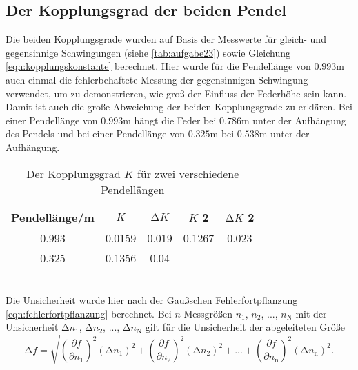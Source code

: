   \subsection{Der Kopplungsgrad der beiden Pendel}
  \label{sec:kopplungsgrad}
  Die beiden Kopplungsgrade wurden auf Basis der Messwerte für gleich- und gegensinnige Schwingungen (siehe \ref{tab:aufgabe23}) sowie Gleichung \eqref{eqn:kopplungskonstante}
  berechnet. Hier wurde für die Pendellänge von $0.993$m auch einmal die fehlerbehaftete Messung der
  gegensinnigen Schwingung verwendet, um zu demonstrieren, wie groß der Einfluss der Federhöhe sein kann. Damit ist auch die
  große Abweichung der beiden Kopplungsgrade zu erklären. Bei einer Pendellänge von $0.993$m hängt die Feder bei $0.786$m unter
  der Aufhängung des Pendels und bei einer Pendellänge von $0.325$m bei $0.538$m unter der Aufhängung.
    \begin{table}
      \centering
        \caption{Der Kopplungsgrad $K$ für zwei verschiedene Pendellängen}
          \label{tab:aufgabe5}
          \begin{tabular}{S S S S S}
            \toprule
            {Pendellänge/m} & {$K$}  & {$\increment K$} & {$K$ 2} & {$\increment K$ 2}\\
               &   0.0159 & 0.019 &  0.1267 & 0.023\\
            0.325   &   0.1356 & 0.04  &         &      \\
            \bottomrule
          \end{tabular}
        \end{table}
        \\
        Die Unsicherheit wurde hier nach der Gaußschen Fehlerfortpflanzung \eqref{eqn:fehlerfortpflanzung} berechnet.
        Bei $n$ Messgrößen $n_\text{1}$, $n_\text{2}$, ..., $n_\text{N}$ mit der Unsicherheit
        $\increment n_\text{1}$, $\increment n_\text{2}$, ..., $\increment n_\text{N}$ gilt für die Unsicherheit
        der abgeleiteten Größe
        \begin{equation}
          \label{eqn:fehlerfortpflanzung}
          \increment f = \sqrt{\left(\frac{\partial f}{\partial n_\text{1}} \right)^2 (\increment n_\text{1})^2 + \left(\frac{\partial f}{\partial n_\text{2}} \right)^2 (\increment
          n_\text{2})^2 + ... + \left(\frac{\partial
          f}{\partial  n_\text{n}} \right)^2 (\increment  n_\text{n})^2}.
        \end{equation}
